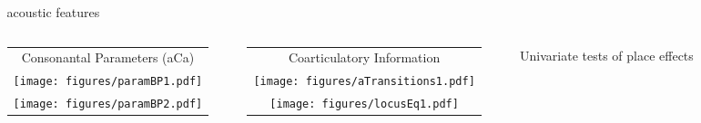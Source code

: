 \documentclass[serif, mathserif, final, xcolor=table]{beamer}
\begin{document}
\begin{frame}[t]{}
\begin{columns}[t]
\begin{column}{0.24\linewidth}
    \end{column}



    \begin{column}{0.72\linewidth}
      \vspace{-1.4cm}
      \begin{columns}[t]
        \begin{column}{0.69\linewidth}

          \begin{block}{acoustic features}
            \begin{columns}
              \begin{column}{0.35\linewidth}
                \bigskip
                \begin{tabular}{c}
                  \quad Consonantal Parameters (aCa) \\
                  \texttt{[image: figures/paramBP1.pdf]} \\
                  \texttt{[image: figures/paramBP2.pdf]} \\
                \end{tabular}
              \end{column}
              \begin{column}{0.35\linewidth}

                \vspace{0.6cm}

                \begin{tabular}{c}
                  \quad\quad Coarticulatory Information \\
                  \texttt{[image: figures/aTransitions1.pdf]} \\[0.5cm]
                  \texttt{[image: figures/locusEq1.pdf]} \\
                \end{tabular}
              \end{column}
              \begin{column}{0.3\linewidth}

                Univariate tests of place effects

                \bigskip


\end{column}
\end{columns}
\end{block}
\end{column}
\end{columns}
\end{column}
\end{columns}
\end{frame}
\end{document}
